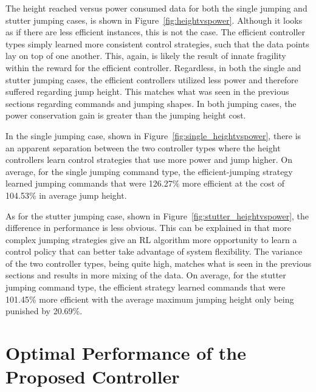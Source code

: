 The height reached versus power consumed data for both the single jumping and stutter jumping cases, is shown in Figure~\ref{fig:heightvspower}. Although it looks as if there are less efficient instances, this is not the case. The efficient controller types simply learned more consistent control strategies, such that the data points lay on top of one another. This, again, is likely the result of innate fragility within the reward for the efficient controller. Regardless, in both the single and stutter jumping cases, the efficient controllers utilized less power and therefore suffered regarding jump height. This matches what was seen in the previous sections regarding commands and jumping shapes. In both jumping cases, the power conservation gain is greater than the jumping height cost. 

In the single jumping case, shown in Figure~\ref{fig:single_heightvspower}, there is an apparent separation between the two controller types where the height controllers learn control strategies that use more power and jump higher. On average, for the single jumping command type, the efficient-jumping strategy learned jumping commands that were 126.27\% more efficient at the cost of 104.53\% in average jump height.

As for the stutter jumping case, shown in Figure~\ref{fig:stutter_heightvspower}, the difference in performance is less obvious. This can be explained in that more complex jumping strategies give an RL algorithm more opportunity to learn a control policy that can better take advantage of system flexibility. The variance of the two controller types, being quite high, matches what is seen in the previous sections and results in more mixing of the data. On average, for the stutter jumping command type, the efficient strategy learned commands that were 101.45\% more efficient with the average maximum jumping height only being punished by 20.69\%.  

\section{Optimal Performance of the Proposed Controller}
\label{section:opt_performance}
% 
